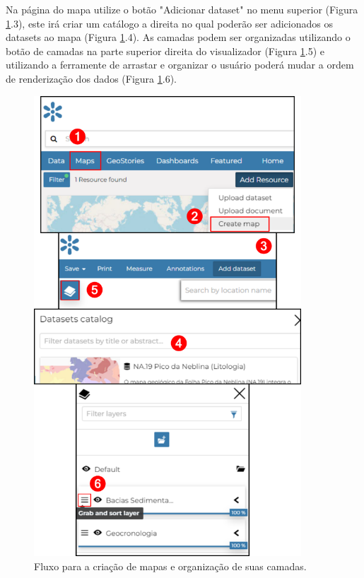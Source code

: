 \documentclass[12pt]{article}
\begin{document}
Na página do mapa utilize o botão "Adicionar dataset" no menu superior (Figura
\ref{fig:criarmapa}.3), este irá criar um catálogo a direita no qual poderão
ser adicionados os datasets ao mapa (Figura \ref{fig:criarmapa}.4). As camadas
podem ser organizadas utilizando o botão de camadas na parte superior direita
do visualizador (Figura \ref{fig:criarmapa}.5) e utilizando a ferramente de
arrastar e organizar o usuário poderá mudar a ordem de renderização dos dados
(Figura \ref{fig:criarmapa}.6).

\begin{figure}[ht]
  \centering
  \includegraphics[width=10cm, keepaspectratio]{img/criarmapa.pdf}
  \caption{Fluxo para a criação de mapas e organização de suas camadas.}
  \label{fig:criarmapa}
\end{figure}



\end{document}
